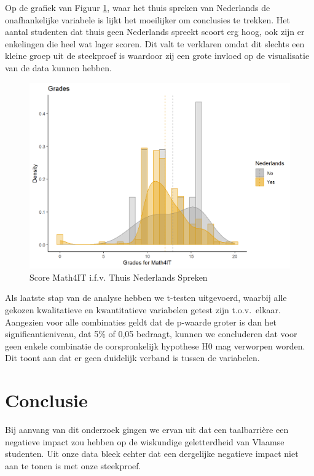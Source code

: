 \documentclass{hogent-article}
\begin{document}
Op de grafiek van Figuur \ref{fig:6}, waar het thuis spreken van Nederlands de onafhankelijke variabele is lijkt het moeilijker om conclusies te trekken. Het aantal studenten dat thuis geen Nederlands spreekt scoort erg hoog, ook zijn er enkelingen die heel wat lager scoren. Dit valt te verklaren omdat dit slechts een kleine groep uit de steekproef is waardoor zij een grote invloed op de visualisatie van de data kunnen hebben.

\begin{figure}
    \includegraphics[width=\linewidth]{Histogram-GradeMath4IT-DutchAtHome.png}
    \caption{\label{fig:6} Score Math4IT i.f.v. Thuis Nederlands Spreken}
\end{figure}

Als laatste stap van de analyse hebben we t-testen uitgevoerd, waarbij alle gekozen kwalitatieve en kwantitatieve variabelen getest zijn t.o.v.\ elkaar. Aangezien voor alle combinaties geldt dat de p-waarde groter is dan het significantieniveau, dat 5\% of 0,05 bedraagt, kunnen we concluderen dat voor geen enkele combinatie de oorspronkelijk hypothese H0 mag verworpen worden. Dit toont aan dat er geen duidelijk verband is tussen de variabelen.

\section{Conclusie}\label{sec:conclusie}

Bij aanvang van dit onderzoek gingen we ervan uit dat een taalbarri\`ere een negatieve impact zou hebben op de wiskundige geletterdheid van Vlaamse studenten. Uit onze data bleek echter dat een dergelijke negatieve impact niet aan te tonen is met onze steekproef.
\end{document}
